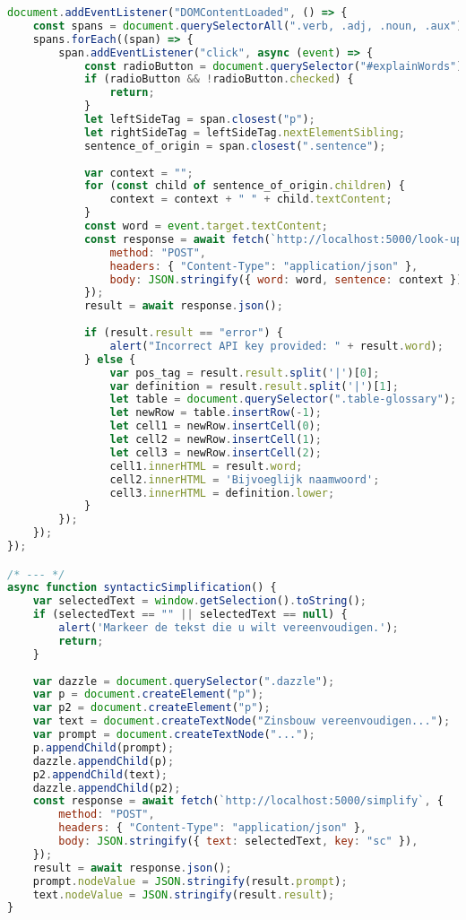 \begin{lstlisting}[language=JavaScript, caption={De toegepaste scripts voor enkel het scholierencomponent.}, label={code:js-scholars}]
document.addEventListener("DOMContentLoaded", () => {
	const spans = document.querySelectorAll(".verb, .adj, .noun, .aux");
	spans.forEach((span) => {
		span.addEventListener("click", async (event) => {
			const radioButton = document.querySelector("#explainWords");
			if (radioButton && !radioButton.checked) {
				return;
			}
			let leftSideTag = span.closest("p");
			let rightSideTag = leftSideTag.nextElementSibling;
			sentence_of_origin = span.closest(".sentence");
			
			var context = "";
			for (const child of sentence_of_origin.children) {
				context = context + " " + child.textContent;
			}
			const word = event.target.textContent;
			const response = await fetch(`http://localhost:5000/look-up-word`, {
				method: "POST",
				headers: { "Content-Type": "application/json" },
				body: JSON.stringify({ word: word, sentence: context }),
			});
			result = await response.json();
			
			if (result.result == "error") {
				alert("Incorrect API key provided: " + result.word);
			} else {
				var pos_tag = result.result.split('|')[0];
				var definition = result.result.split('|')[1];
				let table = document.querySelector(".table-glossary");
				let newRow = table.insertRow(-1);
				let cell1 = newRow.insertCell(0);
				let cell2 = newRow.insertCell(1);
				let cell3 = newRow.insertCell(2);
				cell1.innerHTML = result.word;
				cell2.innerHTML = 'Bijvoeglijk naamwoord';
				cell3.innerHTML = definition.lower;
			}
		});
	});
});

/* --- */
async function syntacticSimplification() {
	var selectedText = window.getSelection().toString();
	if (selectedText == "" || selectedText == null) {
		alert('Markeer de tekst die u wilt vereenvoudigen.');
		return;
	}
	
	var dazzle = document.querySelector(".dazzle");
	var p = document.createElement("p");
	var p2 = document.createElement("p");
	var text = document.createTextNode("Zinsbouw vereenvoudigen...");
	var prompt = document.createTextNode("...");
	p.appendChild(prompt);
	dazzle.appendChild(p);
	p2.appendChild(text);
	dazzle.appendChild(p2);
	const response = await fetch(`http://localhost:5000/simplify`, {
		method: "POST",
		headers: { "Content-Type": "application/json" },
		body: JSON.stringify({ text: selectedText, key: "sc" }),
	});
	result = await response.json();
	prompt.nodeValue = JSON.stringify(result.prompt);
	text.nodeValue = JSON.stringify(result.result);
}


\end{lstlisting}
